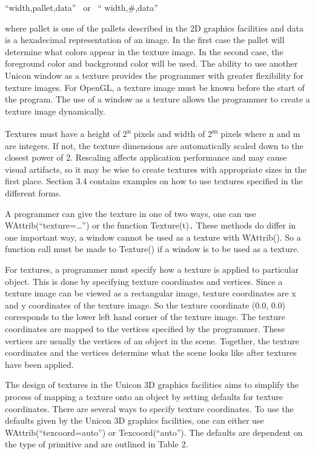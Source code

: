 \documentclass[letterpaper]{article}
\begin{document}
{\sffamily
{}``width,pallet,data'' \ \textrm{or} \ {}`` width,\#,data''}

\noindent where pallet is one of the pallets described in the 2D
graphics facilities and data is a hexadecimal representation of an
image. In the first case the pallet will determine what colors appear
in the texture image. In the second case, the foreground color and
background color will be used. The ability to use another Unicon
window as a texture provides the programmer with greater flexibility
for texture images. For OpenGL, a texture image must be known before
the start of the program. The use of a window as a texture allows
the programmer to create a texture image dynamically.

Textures must have a height of 2\textsuperscript{n} pixels and width
of 2\textsuperscript{m} pixels where n and m are integers. If not, the
texture dimensions are automatically scaled down to the closest power
of 2. Rescaling affects application performance and may cause visual
artifacts, so it may be wise to create textures with appropriate sizes
in the first place. Section 3.4 contains examples on how to use
textures specified in the different forms.

{
A programmer can give the texture in one of two ways, one can use \textsf{WAttrib(``texture={\dots}'') }or the function
\textsf{Texture(t)}\texttt{.} These methods do differ in one important way, a window cannot be used as a texture with
\textsf{WAttrib()}. So a function call must be made to \textsf{Texture()} if a window is to be used as a texture. }

{
For textures, a programmer must specify how a texture is applied to particular object. This is done by specifying
texture coordinates and vertices. Since a texture image can be viewed as a rectangular image, texture coordinates are x
and y coordinates of the texture image. So the texture coordinate \textsf{(0.0, 0.0)} corresponds to the lower left
hand corner of the texture image. The texture coordinates are mapped to the vertices specified by the programmer. These
vertices are usually the vertices of an object in the scene. Together, the texture coordinates and the vertices
determine what the scene looks like after textures have been applied. }

{
The design of textures in the Unicon 3D graphics facilities aims to simplify the process of mapping a texture onto an
object by setting defaults for texture coordinates. There are several ways to specify texture coordinates. To use the
defaults given by the Unicon 3D graphics facilities, one can either use \textsf{WAttrib(``texcoord=auto'')} or
\textsf{Texcoord(``auto'')}. The defaults are dependent on the type of primitive and are outlined in Table 2.}
\end{document}
